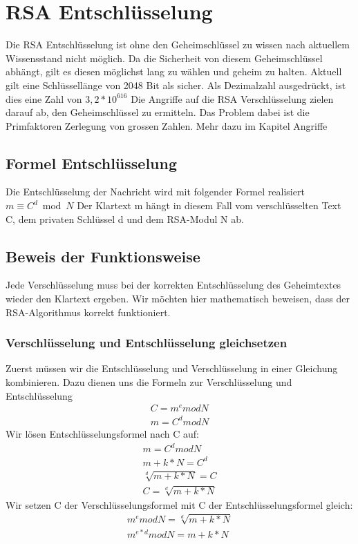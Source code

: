 \section{RSA Entschlüsselung}
Die RSA Entschlüsselung ist ohne den Geheimschlüssel zu wissen nach aktuellem Wissensstand nicht möglich. Da die Sicherheit von diesem Geheimschlüssel abhängt, gilt es diesen möglichst lang zu wählen und geheim zu halten. Aktuell gilt eine Schlüssellänge von 2048 Bit als sicher. Als Dezimalzahl ausgedrückt, ist dies eine Zahl von $ 3,2 * 10^{616} $
Die Angriffe auf die RSA Verschlüsselung zielen darauf ab, den Geheimschlüssel zu ermitteln. Das Problem dabei ist die Primfaktoren Zerlegung von grossen Zahlen. Mehr dazu im Kapitel Angriffe %

\subsection{Formel Entschlüsselung}
Die Entschlüsselung der Nachricht wird mit folgender Formel realisiert
%
$ m \equiv C^d \bmod N $
%
Der Klartext m hängt in diesem Fall vom verschlüsselten Text C, dem privaten Schlüssel d und dem RSA-Modul N ab. 
%
\subsection{Beweis der Funktionsweise}
Jede Verschlüsselung muss bei der korrekten Entschlüsselung des Geheimtextes wieder den Klartext ergeben. Wir möchten hier mathematisch beweisen, dass der RSA-Algorithmus korrekt funktioniert.\\

\subsubsection{Verschlüsselung und Entschlüsselung gleichsetzen}
Zuerst müssen wir die Entschlüsselung und Verschlüsselung in einer Gleichung kombinieren. Dazu dienen uns die Formeln zur Verschlüsselung und Entschlüsselung\\
\begin{align}
  C = m^e mod N \\
  m = C^d mod N
\end{align}
Wir lösen Entschlüsselungsformel nach C auf:
\begin{align}
  m = C^d mod N \\
  m + k * N = C^d \\
  \sqrt[d]{m+k*N} = C \\
  C = \sqrt[d]{m+k*N}
\end{align}
Wir setzen C der Verschlüsselungsformel mit C der Entschlüsselungsformel gleich:
\begin{align}
  m^e mod N = \sqrt[d]{m+k*N}\\
  m^{e*d} mod N = m + k * N
\end{align}

